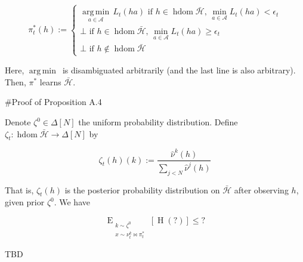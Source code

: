 \documentclass[a4paper]{article}
\newcommand{\EE}[2]{\operatorname{E}_{\substack{#1 \\ #2}}}
\newcommand{\Ent}{\operatorname{H}}
\newcommand{\Argmin}[1]{\underset{#1}{\operatorname{arg\,min}}\,}
\newcommand{\A}{\mathcal{A}}
\DeclareMathOperator{\HD}{hdom}
\newcommand{\Hy}{\mathcal{H}}
\begin{document}
$$\pi^*_t(h):=\begin{cases} \Argmin{a \in \A} L_t(ha) \text{ if } h \in \HD{\bar{\Hy}},\, \min_{a \in \A}{L_t(ha)} < \epsilon_t \\ \bot \text{ if } h \in \HD{\bar{\Hy}},\,\min_{a \in \A}{L_t(ha)} \geq \epsilon_t \\ \bot \text{ if } h \not\in \HD{\bar{\Hy}}\end{cases}$$

Here, $\Argmin{}$ is disambiguated arbitrarily (and the last line is also arbitrary). Then, $\pi^*$ learns $\bar{\Hy}$.
 
\#Proof of Proposition A.4

Denote $\zeta^0 \in \Delta[N]$ the uniform probability distribution. Define $\zeta_t: \HD{\bar{\Hy}} \rightarrow \Delta[N]$ by

$$\zeta_t(h)(k):=\frac{\hat{\nu}^k(h)}{\sum_{j < N}\hat{\nu}^j(h)}$$

That is, $\zeta_t(h)$ is the posterior probability distribution on $\bar{\Hy}$ after observing $h$, given prior $\zeta^0$. We have

$$\EE{k \sim \zeta^0}{x \sim {\nu^k_t}\bowtie{\pi^*_t}}[\Ent(?)] \leq ?$$

TBD
\end{document}
